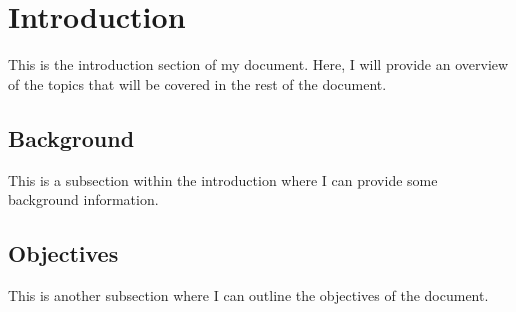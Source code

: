 \section{Introduction}

This is the introduction section of my document. Here, I will provide an overview of the topics that will be covered in the rest of the document.

\subsection{Background}

This is a subsection within the introduction where I can provide some background information.

\subsection{Objectives}

This is another subsection where I can outline the objectives of the document.